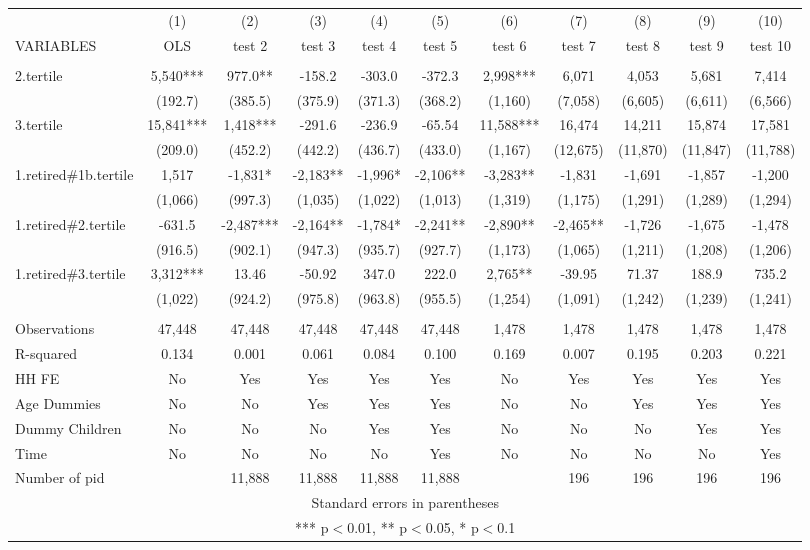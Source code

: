 \begin{tabular}{lcccccccccc} \hline
 & (1) & (2) & (3) & (4) & (5) & (6) & (7) & (8) & (9) & (10) \\
VARIABLES & OLS & test 2 & test 3 & test 4 & test 5 & test 6 & test 7 & test 8 & test 9 & test 10 \\ \hline
 &  &  &  &  &  &  &  &  &  &  \\
2.tertile & 5,540*** & 977.0** & -158.2 & -303.0 & -372.3 & 2,998*** & 6,071 & 4,053 & 5,681 & 7,414 \\
 & (192.7) & (385.5) & (375.9) & (371.3) & (368.2) & (1,160) & (7,058) & (6,605) & (6,611) & (6,566) \\
3.tertile & 15,841*** & 1,418*** & -291.6 & -236.9 & -65.54 & 11,588*** & 16,474 & 14,211 & 15,874 & 17,581 \\
 & (209.0) & (452.2) & (442.2) & (436.7) & (433.0) & (1,167) & (12,675) & (11,870) & (11,847) & (11,788) \\
1.retired\#1b.tertile & 1,517 & -1,831* & -2,183** & -1,996* & -2,106** & -3,283** & -1,831 & -1,691 & -1,857 & -1,200 \\
 & (1,066) & (997.3) & (1,035) & (1,022) & (1,013) & (1,319) & (1,175) & (1,291) & (1,289) & (1,294) \\
1.retired\#2.tertile & -631.5 & -2,487*** & -2,164** & -1,784* & -2,241** & -2,890** & -2,465** & -1,726 & -1,675 & -1,478 \\
 & (916.5) & (902.1) & (947.3) & (935.7) & (927.7) & (1,173) & (1,065) & (1,211) & (1,208) & (1,206) \\
1.retired\#3.tertile & 3,312*** & 13.46 & -50.92 & 347.0 & 222.0 & 2,765** & -39.95 & 71.37 & 188.9 & 735.2 \\
 & (1,022) & (924.2) & (975.8) & (963.8) & (955.5) & (1,254) & (1,091) & (1,242) & (1,239) & (1,241) \\
 &  &  &  &  &  &  &  &  &  &  \\
Observations & 47,448 & 47,448 & 47,448 & 47,448 & 47,448 & 1,478 & 1,478 & 1,478 & 1,478 & 1,478 \\
R-squared & 0.134 & 0.001 & 0.061 & 0.084 & 0.100 & 0.169 & 0.007 & 0.195 & 0.203 & 0.221 \\
HH FE & No & Yes & Yes & Yes & Yes & No & Yes & Yes & Yes & Yes \\
Age Dummies & No & No & Yes & Yes & Yes & No & No & Yes & Yes & Yes \\
Dummy Children & No & No & No & Yes & Yes & No & No & No & Yes & Yes \\
Time & No & No & No & No & Yes & No & No & No & No & Yes \\
 Number of pid &  & 11,888 & 11,888 & 11,888 & 11,888 &  & 196 & 196 & 196 & 196 \\ \hline
\multicolumn{11}{c}{ Standard errors in parentheses} \\
\multicolumn{11}{c}{ *** p$<$0.01, ** p$<$0.05, * p$<$0.1} \\
\end{tabular}
